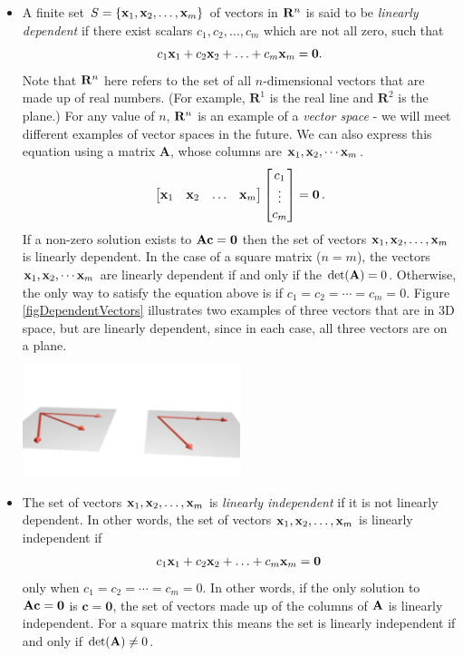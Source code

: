 \begin{itemize}
\item A finite set $S = \{\mathbf{x}_1,\mathbf{x}_2,\ldots,\mathbf{x}_m\}$ of vectors in $\mathbf{R}^n$ is said to be \textit{linearly dependent} if there exist scalars $c_1, c_2, \ldots, c_m$ which are  not all zero,  such that
\[ c_1 \mathbf{x}_1 + c_2 \mathbf{x}_2 + \ldots + c_m \mathbf{x}_m = \mathbf{0}. \] Note that $\mathbf{R}^n$ here refers to the set of all $n$-dimensional vectors that are made up of real numbers. (For example, $\mathbf{R}^1$ is the real line and $\mathbf{R}^2$ is the plane.) For any value of $n$, $\mathbf{R}^n$ is an example of a \textit{vector space} - we will meet different examples of vector spaces in the future. We can also express this equation using a matrix $\mathbf{A}$, whose columns are $\mathbf{x}_1, \mathbf{x}_2, \cdots \mathbf{x}_m$.
\begin{align}
\begin{bmatrix}\mathbf{x}_1 & \mathbf{x}_2 & \hdots & \mathbf{x}_m \end{bmatrix} \begin{bmatrix} c_1 \\ \vdots \\ c_m \end{bmatrix} = \mathbf{0}\,.
\end{align}
If a non-zero solution exists to $\mathbf{A} \mathbf{c} = \mathbf{0}$ then the set of vectors $\mathbf{x}_1,\mathbf{x}_2,\ldots,\mathbf{x}_m$ is linearly dependent. In the case of a square matrix ($n = m$), the vectors $\mathbf{x}_1, \mathbf{x}_2, \cdots \mathbf{x}_m$ are linearly dependent if and only if the $\det(\mathbf{A}) = 0$. Otherwise, the only way to satisfy the equation above is if $c_1 = c_2 = \cdots = c_m = 0$. Figure \ref{figDependentVectors} illustrates two examples of three vectors that are in 3D space, but are linearly dependent, since in each case, all three vectors are on a plane.

\begin{center}
  \includegraphics[width=0.5\textwidth]{FacesDay3/figs/Vec-dep.png}
  \label{figDependentVectors}
\end{center}

\item The set of vectors $\mathbf{x}_1,\mathbf{x}_2,\ldots,\mathbf{x}_m$ is \textit{linearly independent} if it is not linearly dependent. In other words, the set of vectors $\mathbf{x}_1,\mathbf{x}_2,\ldots,\mathbf{x}_m$ is linearly independent if
\begin{align}
c_1 \mathbf{x}_1 + c_2 \mathbf{x}_2 + \ldots + c_m \mathbf{x}_m = \mathbf{0}\,
\end{align}
only when $c_1 = c_2  = \cdots  = c_m = 0$. In other words, if the only solution to $\mathbf{A} \mathbf{c} = \mathbf{0}$ is $\mathbf{c} = \mathbf{0}$,
 the set of vectors  made up of the columns of $\mathbf{A}$ is linearly independent. For a square matrix this means the set is linearly independent if and only if $\det(\mathbf{A}) \ne 0$.


\end{itemize}
